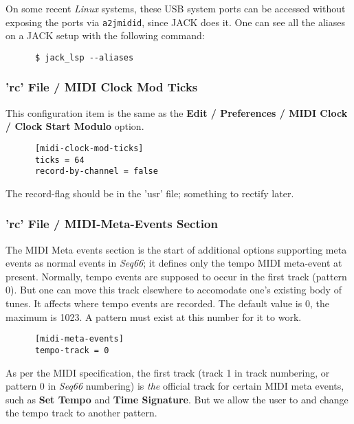    On some recent \textsl{Linux} systems,
   these USB system ports can be accessed without
   exposing the ports via \texttt{a2jmidid}, since JACK does it.
   One can see all the aliases on a JACK setup with the following
   command:

   \begin{verbatim}
      $ jack_lsp --aliases
   \end{verbatim}

\subsubsection{'rc' File / MIDI Clock Mod Ticks}
\label{subsubsec:configuration_rc_midi_cmt}

   This configuration item is the same as the
   \textbf{Edit / Preferences / MIDI Clock / Clock Start Modulo} option.

   \begin{verbatim}
      [midi-clock-mod-ticks]
      ticks = 64
      record-by-channel = false
   \end{verbatim}

   The record-flag should be in the 'usr' file;
   something to rectify later.

\subsubsection{'rc' File / MIDI-Meta-Events Section}
\label{subsubsec:configuration_rc_midi_meta_events}

   The MIDI Meta events section is the start of additional options
   supporting meta events as normal events in \textsl{Seq66};
   it defines only the tempo MIDI meta-event at present.
   Normally, tempo events are supposed to occur in the first track (pattern 0).
   But one can move this track elsewhere to accomodate one's existing body of
   tunes.  It affects where tempo events are recorded.  The default value is 0,
   the maximum is 1023.  A pattern must exist at this number for it to work.

   \begin{verbatim}
      [midi-meta-events]
      tempo-track = 0
   \end{verbatim}

   As per the MIDI specification, the first track (track 1 in track
   numbering, or pattern 0 in \textsl{Seq66} numbering) is \textsl{the}
   official track for certain MIDI meta events, such as
   \textbf{Set Tempo} and
   \textbf{Time Signature}.
   But we allow the user to and change the tempo track to another pattern.

